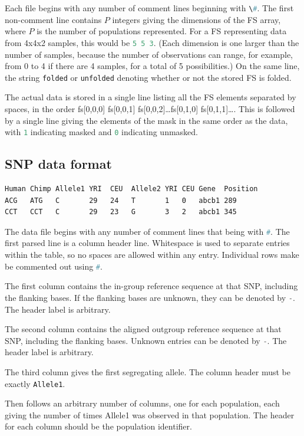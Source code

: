 \documentclass[12pt]{article}
\makeatletter
\newcommand{\py}[1]{\lstinline[language=Python, showstringspaces=False]@#1@}
\makeatother
\begin{document}
Each file begins with any number of comment lines beginning with \py{\#}.
The first non-comment line contains $P$ integers giving the dimensions of the FS array, where $P$ is the number of populations represented.
For a FS representing data from 4x4x2 samples, this would be \py{5 5 3}.
(Each dimension is one larger than the number of samples, because the number of observations can range, for example, from 0 to 4 if there are 4 samples, for a total of 5 possibilities.)
On the same line, the string \py{folded} or \py{unfolded} denoting whether or not the stored FS is folded.

The actual data is stored in a single line listing all the FS elements separated by spaces, in the order fs[0,0,0] fs[0,0,1] fs[0,0,2]\dots fs[0,1,0] fs[0,1,1]\dots.
This is followed by a single line giving the elements of the mask in the same order as the data, with \py{1} indicating masked and \py{0} indicating unmasked.

\subsection{SNP data format}

\begin{lstlisting}[caption={Example of SNP file format}, label={lst:SNP_data}]
Human Chimp Allele1 YRI  CEU  Allele2 YRI CEU Gene  Position
ACG   ATG   C       29   24   T       1   0   abcb1 289
CCT   CCT   C       29   23   G       3   2   abcb1 345
\end{lstlisting}

The data file begins with any number of comment lines that being with \py{#}.
The first parsed line is a column header line.
Whitespace is used to separate entries within the table, so no spaces are allowed within any entry.
Individual rows make be commented out using \py{#}.

The first column contains the in-group reference sequence at that SNP, including the flanking bases.
If the flanking bases are unknown, they can be denoted by \py{-}.
The header label is arbitrary.

The second column contains the aligned outgroup reference sequence at that SNP, including the flanking bases.
Unknown entries can be denoted by \py{-}.
The header label is arbitrary.

The third column gives the first segregating allele.
The column header must be exactly \py{Allele1}.

Then follows an arbitrary number of columns, one for each population, each giving the number of times Allele1 was observed in that population.
The header for each column should be the population identifier.
\end{document}
